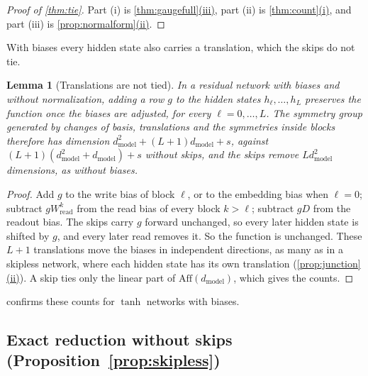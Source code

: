\documentclass[10pt]{article}
\newtheorem{lemma}[theorem]{Lemma}
\theoremstyle{definition}
\theoremstyle{remark}
\newcommand{\Wread}{W_{\mathrm{read}}}
\newcommand{\dm}{d_{\mathrm{model}}}
\newcommand{\Aff}{\mathrm{Aff}}
\DeclareRobustCommand{\cpref}[2]{\hyperref[#1:#2]{\cref*{#1}(#2)}}
\begin{document}
\thmTie*

\begin{proof}[Proof of \cref{thm:tie}]
Part (i) is \cpref{thm:gaugefull}{iii}, part (ii) is \cpref{thm:count}{i}, and part (iii) is \cpref{prop:normalform}{ii}.
\end{proof}

With biases every hidden state also carries a translation, which the skips do not tie.

\begin{lemma}[Translations are not tied]\label{lem:translations}
In a residual network with biases and without normalization, adding a row $g$ to the hidden states $h_\ell, \dots, h_L$ preserves the function once the biases are adjusted, for every $\ell = 0, \dots, L$. The symmetry group generated by changes of basis, translations and the symmetries inside blocks therefore has dimension $\dm^2 + (L+1)\dm + s$, against $(L+1)(\dm^2 + \dm) + s$ without skips, and the skips remove $L\dm^2$ dimensions, as without biases.
\end{lemma}

\begin{proof}
Add $g$ to the write bias of block $\ell$, or to the embedding bias when $\ell = 0$; subtract $g\Wread^{k}$ from the read bias of every block $k > \ell$; subtract $gD$ from the readout bias. The skips carry $g$ forward unchanged, so every later hidden state is shifted by $g$, and every later read removes it. So the function is unchanged. These $L + 1$ translations move the biases in independent directions, as many as in a skipless network, where each hidden state has its own translation (\cpref{prop:junction}{ii}). A skip ties only the linear part of $\Aff(\dm)$, which gives the counts.
\end{proof}

 confirms these counts for $\tanh$ networks with biases.


\subsection{Exact reduction without skips\texorpdfstring{ (Proposition~\ref*{prop:skipless})}{}}\label{app:prf-normalform}
\end{document}
